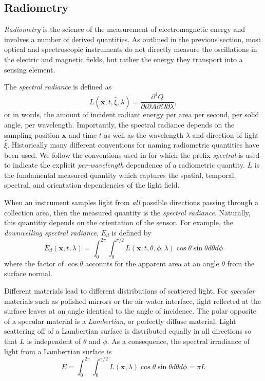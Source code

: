 \subsection{Radiometry}

\textit{Radiometry} is the science of the measurement of electromagnetic energy
and involves a number of derived quantities. As outlined in the previous
section, most optical and spectroscopic instruments do not directly measure the
oscillations in the electric and magnetic fields, but rather the energy they
transport into a sensing element. 

The \textit{spectral radiance} is defined as
\begin{equation}
  L(\mathbf{x}, t, \hat{\xi}, \lambda) = \frac{\partial^4 Q}{\partial t \partial A \partial \Omega \partial \lambda},
\end{equation}
or in words, the amount of incident radiant energy per area per
second, per solid angle, per wavelength. Importantly, the spectral radiance
depends on the sampling position $\mathbf{x}$ and time $t$ as well as the wavelength
$\lambda$ and direction of light $\hat{\xi}$. Historically many different
conventions for naming radiometric quantities have been used. We follow the
conventions used in \cite{mobley-text} for which the prefix \textit{spectral} is
used to indicate the explicit \textit{per-wavelength} dependence of a
radiometric quantity. $L$ is the fundamental measured quantity which captures
the spatial, temporal, spectral, and orientation dependencies of the light field.

When an instrument samples light from \textit{all} possible directions passing
through a collection area, then the
measured quantity is the \textit{spectral radiance}. Naturally, this quantitiy
depends on the orientation of the sensor. For example, the \textit{downwelling
  spectral radiance}, $E_d$ is defined by
\begin{equation}
  E_d(\mathbf{x}, t, \lambda) = \int_0^{2\pi} \int_0^{\pi/2}L(\mathbf{x}, t, \theta, \phi, \lambda)\cos\theta \sin\theta d\theta d\phi
\end{equation}
where the factor of $\cos\theta$ accounts for the apparent area at an angle
$\theta$ from the surface normal.

Different materials lead to different distributions of scattered light. For
\textit{specular} materials such as polished mirrors or the air-water interface, light
reflected at the surface leaves at an angle identical to the angle of incidence.
The polar opposite of a specular material is a \textit{Lambertian}, or perfectly
diffuse material. Light scattering off of a Lambertian surface is distributed
equally in all directions so that $L$ is independent of $\theta$ and $\phi$. As
a consequence, the spectral irradiance of light from a Lambertian surface is
\begin{equation}
  E = \int_0^{2\pi}\int_0^{\pi/2} L(\mathbf{x}, \lambda)\cos\theta \sin\theta d\theta d\phi = \pi L
\end{equation}

